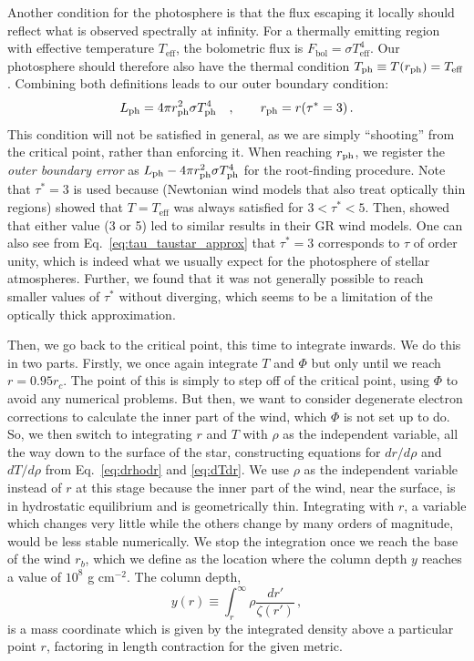 \documentclass[../main.tex]{subfiles}
\begin{document}
Another condition for the photosphere is that the flux escaping it locally should reflect what is observed spectrally at infinity. For a thermally emitting region with effective temperature $T_\text{eff}$, the bolometric flux is $F_\text{bol}=\sigma T_\text{eff}^4$. Our photosphere should therefore also have the thermal condition $T_\text{ph}\equiv T(r_\text{ph})=T_\text{eff}$. Combining both definitions leads to our outer boundary condition:
\begin{equation}\label{eq:wind_outerBC}
    L_\text{ph}=4\pi r_\text{ph}^2\sigma T_\text{ph}^4 \quad, \qquad r_\text{ph}=r(\tau^*=3)\,.
\end{equation}
This condition will not be satisfied in general, as we are simply ``shooting'' from the critical point, rather than enforcing it. When reaching $r_\text{ph}$, we register the \textit{outer boundary error} as $L_\text{ph}-4\pi r_\text{ph}^2\sigma T_\text{ph}^4$ for the root-finding procedure. Note that $\tau^*=3$ is used because \citet{Quinn1985} (Newtonian wind models that also treat optically thin regions) showed that $T=T_\text{eff}$ was always satisfied for $3<\tau^*<5$. Then, \citet{Paczynski1986b} showed that either value (3 or 5) led to similar results in their GR wind models. One can also see from Eq.~\eqref{eq:tau_taustar_approx} that $\tau
^*=3$ corresponds to $\tau$ of order unity, which is indeed what we usually expect for the photosphere of stellar atmospheres. Further, we found that it was not generally possible to reach smaller values of $\tau^*$ without diverging, which seems to be a limitation of the optically thick approximation. 

Then, we go back to the critical point, this time to integrate inwards. We do this in two parts. Firstly, we once again integrate $T$ and $\Phi$ but only until we reach $r=0.95 r_c$. The point of this is simply to step off of the critical point, using $\Phi$ to avoid any numerical problems. But then, we want to consider degenerate electron corrections to calculate the inner part of the wind, which $\Phi$ is not set up to do. So, we then switch to integrating $r$ and $T$ with $\rho$ as the independent variable, all the way down to the surface of the star, constructing equations for $dr/d\rho$ and  $dT/d\rho$ from Eq.~\eqref{eq:drhodr} and \eqref{eq:dTdr}. We use $\rho$ as the independent variable instead of $r$ at this stage because the inner part of the wind, near the surface, is in hydrostatic equilibrium and is geometrically thin. Integrating with $r$, a variable which changes very little while the others change by many orders of magnitude, would be less stable numerically. We stop the integration once we reach the base of the wind $r_b$, which we define as the location where the column depth $y$ reaches a value of $10
^8$ g cm$^{-2}$. The column depth,
\begin{equation}\label{eq:columndepth}
    y(r)\equiv \int_r^\infty \rho \frac{dr'}{\zeta(r')}\,,
\end{equation}
is a mass coordinate which is given by the integrated density above a particular point $r$, factoring in length contraction for the given metric. 
\end{document}
